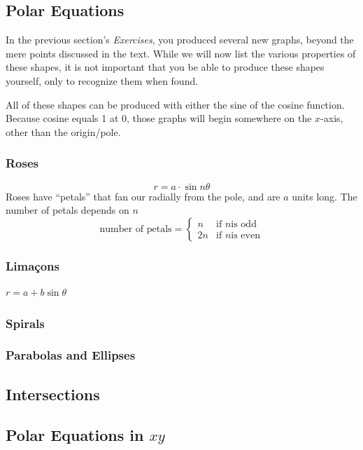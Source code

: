 \subsection{Polar Equations}
In the previous section's \textit{Exercises}, you produced several new graphs, beyond the
mere points discussed in the text.  While we will now list the various properties of these
shapes, it is not important that you be able to produce these shapes yourself, only to
recognize them when found.

All of these shapes can be produced with either the sine of the cosine function.  Because
cosine equals 1 at 0, those graphs will begin somewhere on the $x$-axis, other than the
origin/pole.

\subsubsection{Roses}
\begin{equation}
r = a \cdot \sin n\theta
\end{equation}
Roses have ``petals'' that fan our radially from the pole, and are $a$ units long.  The
number of petals depends on $n$
\[
 \text{number of petals} = 
  \begin{cases} 
   n & \text{if } n \text{is odd} \\
   2n       & \text{if } n \text{is even}
  \end{cases}
\]

\subsubsection{Limaçons}
\begin{derivation}{}
$r = a + b \sin \theta$
\end{derivation}

\subsubsection{Spirals}
\subsubsection{Parabolas and Ellipses}

\subsection{Intersections}
\subsection{Polar Equations in $xy$}
\newpage
